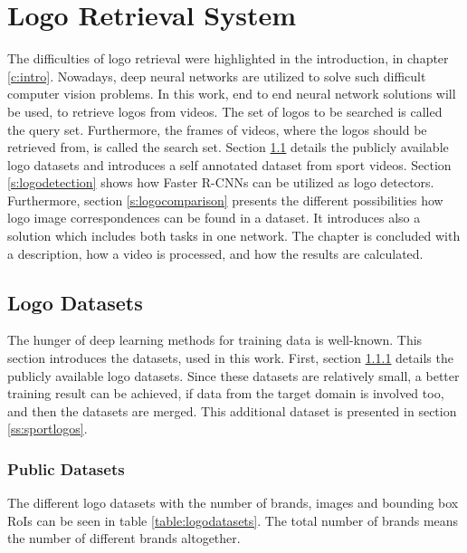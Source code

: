 \chapter{Logo Retrieval System}\label{c:logoretrievalsystem}

The difficulties of logo retrieval were highlighted in the introduction, in chapter \ref{c:intro}. Nowadays, deep neural networks are utilized to solve such difficult computer vision problems. In this work, end to end neural network solutions will be used, to retrieve logos from videos. The set of logos to be searched is called the query set. Furthermore, the frames of videos, where the logos should be retrieved from, is called the search set.
\bigbreak
Section \ref{s:logodatasets} details the publicly available logo datasets and introduces a self annotated dataset from sport videos. Section \ref{s:logodetection} shows how Faster R-CNNs can be utilized as logo detectors. Furthermore, section \ref{s:logocomparison} presents the different possibilities how logo image correspondences can be found in a dataset. It introduces also a solution which includes both tasks in one network. The chapter is concluded with a description, how a video is processed, and how the results are calculated.
\bigbreak
\section{Logo Datasets}\label{s:logodatasets}
The hunger of deep learning methods for training data is well-known. This section introduces the datasets, used in this work. First, section \ref{ss:publicdatasets} details the publicly available logo datasets. Since these datasets are relatively small, a better training result can be achieved, if data from the target domain is involved too, and then the datasets are merged. This additional dataset is presented in section \ref{ss:sportlogos}.
\bigbreak
\subsection{Public Datasets}\label{ss:publicdatasets}
The different logo datasets with the number of brands, images and bounding box RoIs can be seen in table \ref{table:logodatasets}. The total number of brands means the number of different brands altogether.

